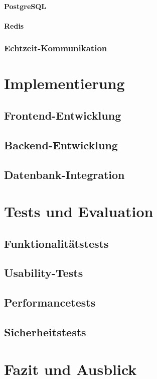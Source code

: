 \documentclass[a4paper,12pt]{report}
\begin{document}
        		\subsubsection{PostgreSQL}
        		\subsubsection{Redis}
        \subsection{Echtzeit-Kommunikation}

\chapter{Implementierung}
    \section{Frontend-Entwicklung}
    \section{Backend-Entwicklung}
    \section{Datenbank-Integration}

\chapter{Tests und Evaluation}
    \section{Funktionalitätstests}
    \section{Usability-Tests}
    \section{Performancetests}
    \section{Sicherheitstests}

\chapter{Fazit und Ausblick}
\end{document}
